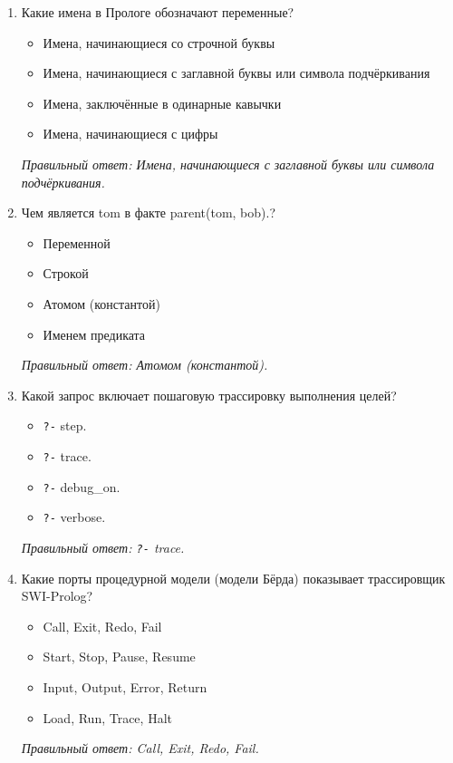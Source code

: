 \begin{enumerate}[label=\textbf{\arabic*.}, leftmargin=0pt, itemsep=1.2em]
\item Какие имена в Прологе обозначают переменные?
\begin{itemize}[label=$\square$, leftmargin=1.5cm, itemsep=0.2em, topsep=0.3em]
\item Имена, начинающиеся со строчной буквы
\item Имена, начинающиеся с заглавной буквы или символа подчёркивания
\item Имена, заключённые в одинарные кавычки
\item Имена, начинающиеся с цифры
\end{itemize}
{\small\textit{Правильный ответ: Имена, начинающиеся с заглавной буквы или символа подчёркивания.}}

\item Чем является tom в факте parent(tom, bob).?
\begin{itemize}[label=$\square$, leftmargin=1.5cm, itemsep=0.2em, topsep=0.3em]
\item Переменной
\item Строкой
\item Атомом (константой)
\item Именем предиката
\end{itemize}
{\small\textit{Правильный ответ: Атомом (константой).}}

\item Какой запрос включает пошаговую трассировку выполнения целей?
\begin{itemize}[label=$\square$, leftmargin=1.5cm, itemsep=0.2em, topsep=0.3em]
\item \texttt{?-} step.
\item \texttt{?-} trace.
\item \texttt{?-} debug\_on.
\item \texttt{?-} verbose.
\end{itemize}
{\small\textit{Правильный ответ: \texttt{?-} trace.}}

\item Какие порты процедурной модели (модели Бёрда) показывает трассировщик SWI-Prolog?
\begin{itemize}[label=$\square$, leftmargin=1.5cm, itemsep=0.2em, topsep=0.3em]
\item Call, Exit, Redo, Fail
\item Start, Stop, Pause, Resume
\item Input, Output, Error, Return
\item Load, Run, Trace, Halt
\end{itemize}
{\small\textit{Правильный ответ: Call, Exit, Redo, Fail.}}


\end{enumerate}
